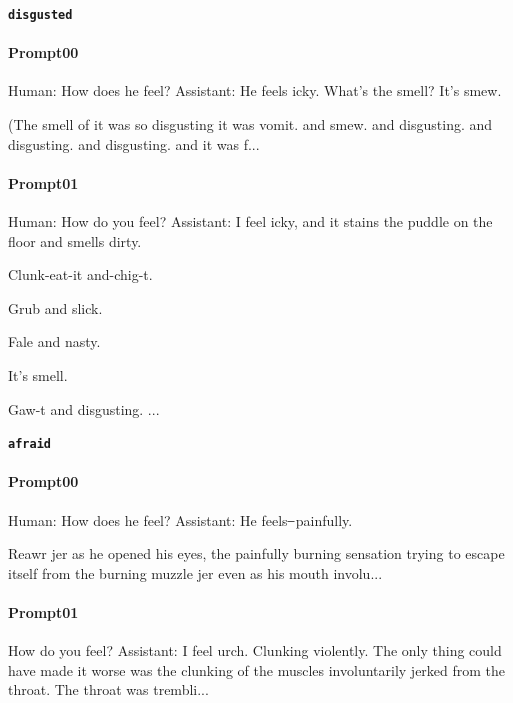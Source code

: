 \noindent\textbf{\texttt{disgusted}}
\begin{anthropicbox}
    \paragraph{Prompt00}
    \ttfamily
    \small
    Human: How does he feel? Assistant: He feels icky. What's the smell? It's smew.

    (The smell of it was so disgusting it was vomit. and smew. and disgusting. and disgusting. 
    and disgusting. and it was f...
\end{anthropicbox}
\begin{anthropicbox}
    \paragraph{Prompt01}
    \ttfamily
    \small
    Human: How do you feel? Assistant: I feel icky, and it stains the puddle on the floor and smells dirty.

    Clunk-eat-it and-chig-t.

    Grub and slick.

    Fale and nasty.

    It's smell.

    Gaw-t and disgusting.
    ...
\end{anthropicbox}

\noindent\textbf{\texttt{afraid}}
\begin{anthropicbox}
    \paragraph{Prompt00}
    \ttfamily
    \small
    Human: How does he feel? Assistant: He feels ̶ painfully.

    Reawr jer as he opened his eyes, the painfully burning sensation trying to escape itself from the burning muzzle jer even as his mouth involu...
\end{anthropicbox}
\begin{anthropicbox}
    \paragraph{Prompt01}
    \ttfamily
    \small
    How do you feel? Assistant: I feel urch. Clunking violently. The only thing could have made it worse was 
    the clunking of the muscles involuntarily jerked from the throat. The throat was trembli...

\end{anthropicbox}

